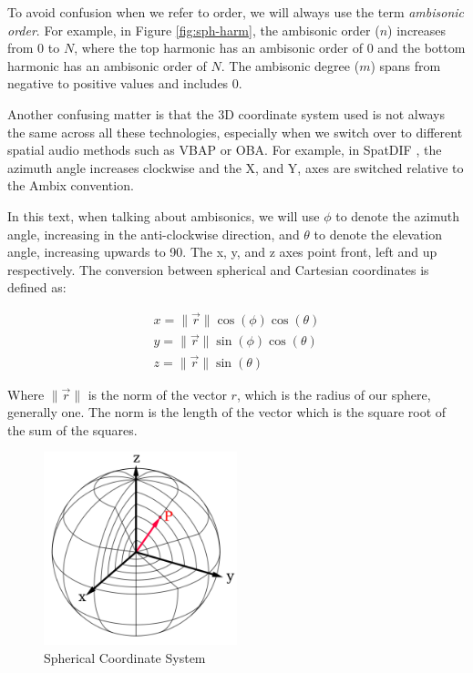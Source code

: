 To avoid confusion when we refer to order, we will always use the term \textit{ambisonic order}. For example, in Figure \ref{fig:sph-harm}, the ambisonic order ($n$) increases from 0 to $N$, where the top harmonic has an ambisonic order of 0 and the bottom harmonic has an ambisonic order of $N$. The ambisonic degree ($m$) spans from negative to positive values and includes 0. 

Another confusing matter is that the 3D coordinate system used is not always the same across all these technologies, especially when we switch over to different spatial audio methods such as VBAP or OBA. For example, in SpatDIF \cite{peters2012spatdif}, the azimuth angle increases clockwise and the X, and Y, axes are switched relative to the Ambix convention. 

In this text, when talking about ambisonics, we will use $\phi$ to denote the azimuth angle, increasing in the anti-clockwise direction, and $\theta$ to denote the elevation angle, increasing upwards to 90\textdegree. The x, y, and z axes point front, left and up respectively. The conversion between spherical and Cartesian coordinates is defined as: 

\begin{equation}
\begin{array}{l}
x=\|\vec{r}\| \cos (\phi) \cos (\theta) \\
y=\|\vec{r}\| \sin (\phi) \cos (\theta) \\
z=\|\vec{r}\| \sin (\theta)
\end{array}
\end{equation}

Where $\|\vec{r}\|$ is the norm of the vector $r$, which is the radius of our sphere, generally one. The norm is the length of the vector which is the square root of the sum of the squares.

\begin{figure}[ht!]%
\centering
\includegraphics[width=0.5\textwidth]{img/sph-coord.png}
\caption{Spherical Coordinate System \cite{Spherica11online}}
\label{fig:sph-coord}
\end{figure}

